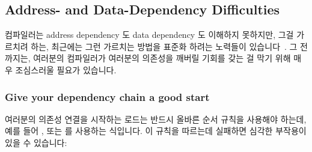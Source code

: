 \subsection{Address- and Data-Dependency Difficulties}
\label{sec:memorder:Address- and Data-Dependency Difficulties}

컴파일러는 address dependency 도 data dependency 도 이해하지 못하지만, 그걸
가르치려 하는, 최근에는 그런 가르치는 방법을 표준화 하려는 노력들이
있습니다~\cite{PaulEMcKennneyConsumeP0190R4,PaulEMcKenney2017markconsumeP0462R1}.
그 전까지는, 여러분의 컴파일러가 여러분의 의존성을 깨버릴 기회를 갖는 걸 막기
위해 매우 조심스러울 필요가 있습니다.

\subsubsection{Give your dependency chain a good start}

여러분의 의존성 연결을 시작하는 로드는 반드시 올바른 순서 규칙을 사용해야 하는데,
예를 들어 , 또는  를 사용하는 식입니다.
이 규칙을 따르는데 실패하면 심각한 부작용이 있을 수 있습니다:

